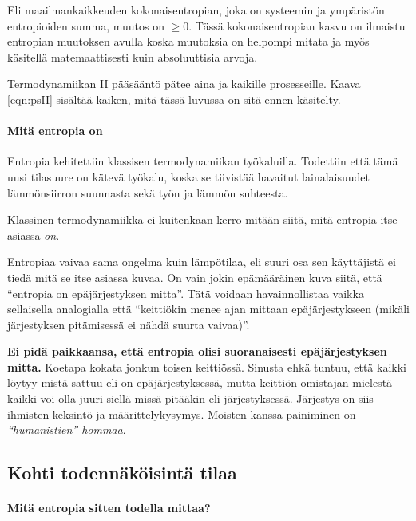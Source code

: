 \documentclass[12pt,a4paper,finnish]{book}
\begin{document}
Eli maailmankaikkeuden kokonaisentropian, joka on systeemin ja ympäristön entropioiden summa, muutos on $\geq 0$. 
Tässä kokonaisentropian kasvu on ilmaistu entropian muutoksen avulla koska muutoksia on helpompi mitata 
ja myös käsitellä matemaattisesti kuin absoluuttisia arvoja.

Termodynamiikan II pääsääntö pätee aina ja kaikille prosesseille. Kaava \ref{eqn:psII} sisältää kaiken, 
mitä tässä luvussa on sitä ennen käsitelty.


\paragraph{Mitä entropia on}

Entropia kehitettiin klassisen termodynamiikan työkaluilla. Todettiin että tämä uusi tilasuure on kätevä 
työkalu, koska se tiivistää havaitut lainalaisuudet lämmönsiirron suunnasta sekä työn ja lämmön suhteesta.

Klassinen termodynamiikka 
ei kuitenkaan kerro mitään siitä, mitä entropia itse asiassa \textit{on}.

Entropiaa vaivaa sama ongelma kuin lämpötilaa, eli suuri osa sen käyttäjistä ei tiedä mitä se itse asiassa 
kuvaa. On vain jokin epämääräinen kuva siitä, että ``entropia on epäjärjestyksen mitta''. Tätä voidaan 
havainnollistaa vaikka sellaisella analogialla että ``keittiökin menee ajan mittaan epäjärjestykseen 
(mikäli järjestyksen pitämisessä ei nähdä suurta vaivaa)''. 

\textbf{Ei pidä paikkaansa, että entropia olisi suoranaisesti epäjärjestyksen mitta.} Koetapa kokata jonkun 
toisen keittiössä. Sinusta ehkä tuntuu, että kaikki löytyy mistä sattuu eli on epäjärjestyksessä, mutta keittiön 
omistajan mielestä kaikki voi olla juuri siellä missä pitääkin eli järjestyksessä. Järjestys on siis ihmisten 
keksintö ja määrittelykysymys. Moisten kanssa painiminen on \textit{``humanistien'' hommaa}.

\subsection{Kohti todennäköisintä tilaa}

\paragraph{Mitä entropia sitten todella mittaa?}
\end{document}

